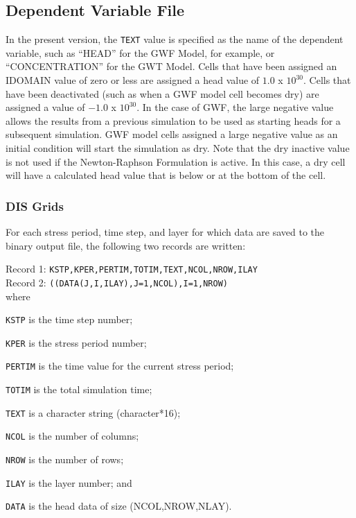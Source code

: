 \subsection{Dependent Variable File}
In the present \mf version, the \texttt{TEXT} value is specified as the name of the dependent variable, such as ``HEAD'' for the GWF Model, for example, or ``CONCENTRATION'' for the GWT Model.  Cells that have been assigned an IDOMAIN value of zero or less are assigned a head value of $1.0$ x $10^{30}$.  Cells that have been deactivated (such as when a GWF model cell becomes dry) are assigned a value of $-1.0$ x $10^{30}$.  In the case of GWF, the large negative value allows the results from a previous simulation to be used as starting heads for a subsequent simulation.  GWF model cells assigned a large negative value as an initial condition will start the simulation as dry.  Note that the dry inactive value is not used if the Newton-Raphson Formulation is active.  In this case, a dry cell will have a calculated head value that is below or at the bottom of the cell.

\subsubsection{DIS Grids}
For each stress period, time step, and layer for which data are saved to the binary output file, the following two records are written:

\vspace{5mm}
\noindent Record 1: \texttt{KSTP,KPER,PERTIM,TOTIM,TEXT,NCOL,NROW,ILAY} \\
\noindent Record 2: \texttt{((DATA(J,I,ILAY),J=1,NCOL),I=1,NROW)} \\

\vspace{5mm}
\noindent where

\begin{description} \itemsep0pt \parskip0pt 
\item \texttt{KSTP} is the time step number;
\item \texttt{KPER} is the stress period number;
\item \texttt{PERTIM} is the time value for the current stress period; 
\item \texttt{TOTIM} is the total simulation time;
\item \texttt{TEXT} is a character string (character*16);
\item \texttt{NCOL} is the number of columns;
\item \texttt{NROW} is the number of rows;
\item \texttt{ILAY} is the layer number; and
\item \texttt{DATA} is the head data of size (NCOL,NROW,NLAY).
\end{description}

